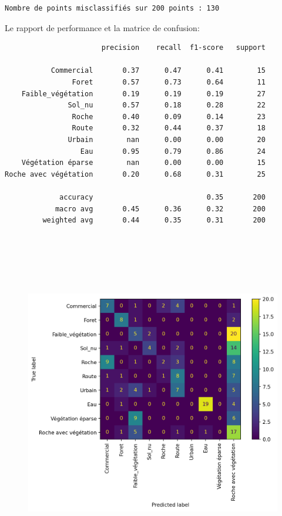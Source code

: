 \documentclass[
]{article}
\begin{document}
\begin{verbatim}
Nombre de points misclassifiés sur 200 points : 130
\end{verbatim}

Le rapport de performance et la matrice de confusion:

\label{62023190}
\begin{verbatim}
                       precision    recall  f1-score   support

           Commercial       0.37      0.47      0.41        15
                Foret       0.57      0.73      0.64        11
    Faible_végétation       0.19      0.19      0.19        27
               Sol_nu       0.57      0.18      0.28        22
                Roche       0.40      0.09      0.14        23
                Route       0.32      0.44      0.37        18
               Urbain        nan      0.00      0.00        20
                  Eau       0.95      0.79      0.86        24
    Végétation éparse        nan      0.00      0.00        15
Roche avec végétation       0.20      0.68      0.31        25

             accuracy                           0.35       200
            macro avg       0.45      0.36      0.32       200
         weighted avg       0.44      0.35      0.31       200
\end{verbatim}

\label{c5af5511}
\begin{figure}
\centering
\includegraphics[width=6.83333in,height=5.97917in]{05-ClassificationsSupervisees_files/figure-html/cell-37-output-1.png}
\caption{}
\end{figure}
\end{document}
